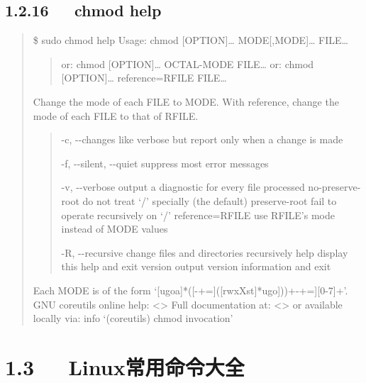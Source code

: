 \documentclass[letterpaper,12pt,english]{sphinxmanual}
\begin{document}
\subsection{1.2.16   chmod \textendash{}help}
\label{\detokenize{001software/001install/linux:chmod-help}}\begin{quote}

\$ sudo chmod \textendash{}help
Usage: chmod {[}OPTION{]}… MODE{[},MODE{]}… FILE…
\begin{quote}

or:  chmod {[}OPTION{]}… OCTAL-MODE FILE…
or:  chmod {[}OPTION{]}… \textendash{}reference=RFILE FILE…
\end{quote}

Change the mode of each FILE to MODE.
With \textendash{}reference, change the mode of each FILE to that of RFILE.
\begin{quote}
\begin{optionlist}{3cm}
\item [-c, -{-}changes]  
like verbose but report only when a change is made
\item [-f, -{-}silent, -{-}quiet]  
suppress most error messages
\item [-v, -{-}verbose]  
output a diagnostic for every file processed
\textendash{}no-preserve-root  do not treat ‘/’ specially (the default)
\textendash{}preserve-root    fail to operate recursively on ‘/’
\textendash{}reference=RFILE  use RFILE’s mode instead of MODE values
\item [-R, -{-}recursive]  
change files and directories recursively
\textendash{}help     display this help and exit
\textendash{}version  output version information and exit
\end{optionlist}
\end{quote}

Each MODE is of the form ‘{[}ugoa{]}*({[}-+={]}({[}rwxXst{]}*\textbar{}{[}ugo{]}))+\textbar{}{[}-+={]}{[}0-7{]}+’.
GNU coreutils online help: \textless{}\textgreater{}
Full documentation at: \textless{}\textgreater{}
or available locally via: info ‘(coreutils) chmod invocation’
\end{quote}


\section{1.3   Linux常用命令大全}
\label{\detokenize{001software/001install/linux:linux}}
\end{document}
